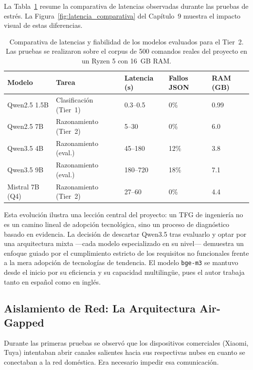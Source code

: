 La Tabla~\ref{tab:modelos_evaluados} resume la comparativa de latencias observadas durante las pruebas de estrés. La Figura~\ref{fig:latencia_comparativa} del Capítulo~9 muestra el impacto visual de estas diferencias.

\begin{table}[ht]
\centering
\small
\setlength{\tabcolsep}{5pt}
\begin{tabular}{|p{2.5cm}|p{3.2cm}|p{2.0cm}|p{2.0cm}|p{2.0cm}|}
\hline
\textbf{Modelo} & \textbf{Tarea} & \textbf{Latencia (s)} & \textbf{Fallos JSON} & \textbf{RAM (GB)} \\
\hline
Qwen2.5 1.5B & Clasificación (Tier~1) & 0.3--0.5 & 0\% & 0.99 \\
Qwen2.5 7B & Razonamiento (Tier~2) & 5--30 & 0\% & 6.0 \\
Qwen3.5 4B & Razonamiento (eval.) & 45--180 & 12\% & 3.8 \\
Qwen3.5 9B & Razonamiento (eval.) & 180--720 & 18\% & 7.1 \\
Mistral 7B (Q4) & Razonamiento (Tier~2) & 27--60 & 0\% & 4.4 \\
\hline
\end{tabular}
\caption{Comparativa de latencias y fiabilidad de los modelos evaluados para el Tier~2. Las pruebas se realizaron sobre el corpus de 500 comandos reales del proyecto en un Ryzen 5 con 16~GB RAM.}
\label{tab:modelos_evaluados}
\end{table}

Esta evolución ilustra una lección central del proyecto: un TFG de ingeniería no es un camino lineal de adopción tecnológica, sino un proceso de diagnóstico basado en evidencia. La decisión de descartar Qwen3.5 tras evaluarlo y optar por una arquitectura mixta ---cada modelo especializado en su nivel--- demuestra un enfoque guiado por el cumplimiento estricto de los requisitos no funcionales frente a la mera adopción de tecnologías de tendencia. El modelo \texttt{bge-m3} se mantuvo desde el inicio por su eficiencia y su capacidad multilingüe, pues el autor trabaja tanto en español como en inglés.

\subsection{Aislamiento de Red: La Arquitectura Air-Gapped}

Durante las primeras pruebas se observó que los dispositivos comerciales (Xiaomi, Tuya) intentaban abrir canales salientes hacia sus respectivas nubes en cuanto se conectaban a la red doméstica. Era necesario impedir esa comunicación.

